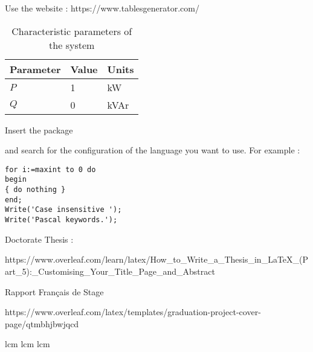 
Use the website : https://www.tablesgenerator.com/

\begin{table}[tb]
	\centering
	\begin{tabular}{lll}
		Parameter & Value & Units\\
		\hline
		$P$ & 1 & kW \\
		$Q$ & 0 & kVAr\\
	    \hline
	\end{tabular}
	\caption{Characteristic parameters of the system}
	\label{tab:tab1}
\end{table}



Insert the package \usepackage{listings} and search for the configuration of the language you want to use. For example : 

\usepackage{listings} %

\begin{lstlisting}[caption=Source code for {\it hello.m},label=lst:code1,breaklines=true,basewidth=4pt,prebreak=**,postbreak=**,frame=single]
for i:=maxint to 0 do
begin
{ do nothing }
end;
Write('Case insensitive ');
Write('Pascal keywords.');
\end{lstlisting}
   


Doctorate Thesis : 

https://www.overleaf.com/learn/latex/How_to_Write_a_Thesis_in_LaTeX_(Part_5):_Customising_Your_Title_Page_and_Abstract

Rapport Français de Stage

https://www.overleaf.com/latex/templates/graduation-project-cover-page/qtmbhjbwjqcd

\acrshort{lcm}
\acrlong{lcm}
\acrfull{lcm}
